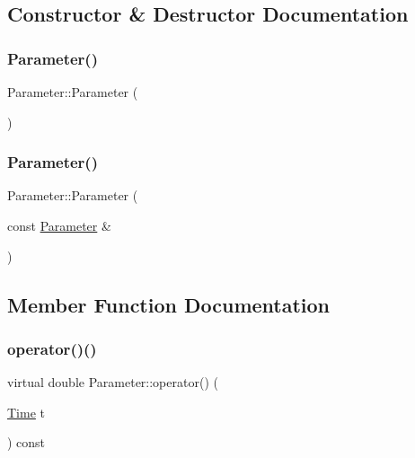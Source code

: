 \subsection{Constructor \& Destructor Documentation}
\hypertarget{class_parameter_a5de1d76f6b0342f3e98d004733ce9c2c}{}\label{class_parameter_a5de1d76f6b0342f3e98d004733ce9c2c} 
\subsubsection{\texorpdfstring{Parameter()}{Parameter()}\hspace{0.1cm}{\footnotesize\ttfamily [1/2]}}
{\footnotesize\ttfamily Parameter\+::\+Parameter (\begin{DoxyParamCaption}{ }\end{DoxyParamCaption})\hspace{0.3cm}{\ttfamily [default]}}

\hypertarget{class_parameter_a07b46a4af924cbaea806505343d7b83a}{}\label{class_parameter_a07b46a4af924cbaea806505343d7b83a} 
\subsubsection{\texorpdfstring{Parameter()}{Parameter()}\hspace{0.1cm}{\footnotesize\ttfamily [2/2]}}
{\footnotesize\ttfamily Parameter\+::\+Parameter (\begin{DoxyParamCaption}\item[{const \hyperlink{class_parameter}{Parameter} \&}]{ }\end{DoxyParamCaption})\hspace{0.3cm}{\ttfamily [default]}}



\subsection{Member Function Documentation}
\hypertarget{class_parameter_ae6317fac3d0b5e69101eb7059d151ca7}{}\label{class_parameter_ae6317fac3d0b5e69101eb7059d151ca7} 
\subsubsection{\texorpdfstring{operator()()}{operator()()}}
{\footnotesize\ttfamily virtual double Parameter\+::operator() (\begin{DoxyParamCaption}\item[{\hyperlink{_name_def_8h_ac2d3e0ba793497bcca555c7c2cf64ff3}{Time}}]{t }\end{DoxyParamCaption}) const\hspace{0.3cm}{\ttfamily [pure virtual]}}



